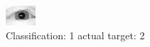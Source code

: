 \begin{figure}[h!]
\begin{center}
\includegraphics[width=0.60\columnwidth]{figures/ID3080_class_1_target_2.png}
\end{center}
\caption{ Classification: 1 actual target: 2}
\label{fig:ID3080_class_1_target_2}
\end{figure}
